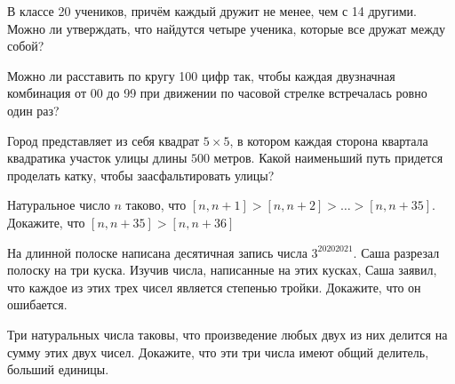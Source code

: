 \documentclass{article}
\begin{document}
\begin{enumerate_boxed}
        \item В классе 20 учеников, причём каждый дружит не менее, чем с 14 другими.
        Можно ли утверждать, что найдутся четыре ученика, которые все дружат
        между собой?

        \item Можно ли расставить по кругу 100 цифр так, чтобы каждая двузначная комбинация от 00 до 99 при движении по часовой стрелке встречалась ровно один раз?

        \item Город представляет из себя квадрат $5 \times 5$, в котором каждая сторона квартала квадратика участок улицы длины $500$ метров.
        Какой наименьший путь придется проделать катку, чтобы заасфальтировать улицы?

        \item Натуральное число $n$ таково, что
        $[n, n + 1] > [n, n + 2] > \dotsc > [n, n + 35]$.
        Докажите, что $[n, n + 35] >[n, n + 36]$

        \item На длинной полоске написана десятичная запись числа $3^{20202021}$.
        Саша разрезал полоску на три куска.
        Изучив числа, написанные на этих кусках, Саша заявил, что каждое из этих трех чисел является степенью тройки.
        Докажите, что он ошибается.

        \item Три натуральных числа таковы, что произведение любых двух из них делится на сумму этих двух чисел.
        Докажите, что эти три числа имеют общий делитель, больший единицы.

    \end{enumerate_boxed}
\end{document}
